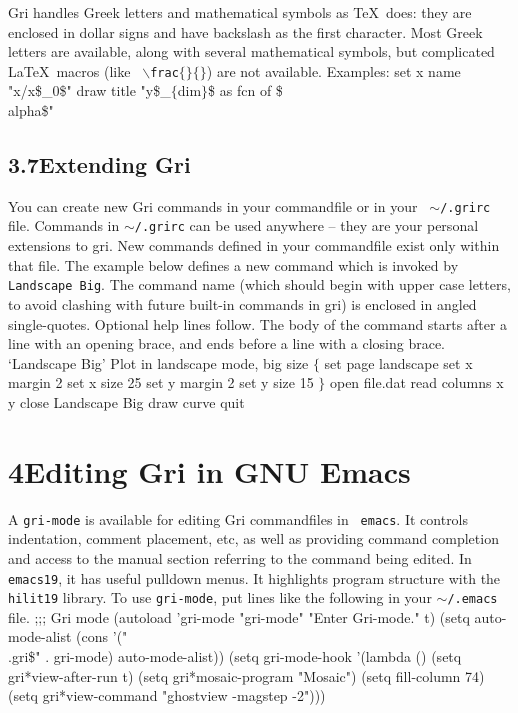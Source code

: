 Gri handles Greek letters and mathematical symbols as \TeX\ does: they
are enclosed in dollar signs and have backslash as the first
character.  Most Greek letters are available, along with several
mathematical symbols, but complicated La\TeX\ macros (like {\tt
$\backslash$frac$\lbrace\rbrace\lbrace\rbrace$}) are not available.
Examples:
\beginexample
set x name "x/x\$_0\$"
draw title "y\$_$\lbrace$dim$\rbrace$\$ as fcn of \$\\alpha\$"
\endexample



\subsection{3.7\quad Extending Gri}
You can create new Gri commands in your commandfile or in your {\tt
$\sim$/.grirc} file.  Commands in {\tt $\sim$/.grirc} can be used
anywhere -- they are your personal extensions to gri.  New commands
defined in your commandfile exist only within that file.  The example
below defines a new command which is invoked by {\tt Landscape Big}.
The command name (which should begin with upper case letters, to avoid
clashing with future built-in commands in gri) is enclosed in angled
single-quotes.  Optional help lines follow.  The body of the command
starts after a line with an opening brace, and ends before a line with
a closing brace.
\beginexample
`Landscape Big'
Plot in landscape mode, big size
$\lbrace$
    set page landscape
    set x margin 2
    set x size 25
    set y margin 2
    set y size 15
$\rbrace$
open file.dat
read columns x y
close
Landscape Big
draw curve
quit
\endexample

\section{4\quad Editing Gri in GNU Emacs}
A {\tt gri-mode} is available for editing Gri commandfiles in {\tt
emacs}.  It controls indentation, comment placement, etc, as well as
providing command completion and access to the manual section
referring to the command being edited.  In {\tt emacs19}, it has
useful pulldown menus.  It highlights program structure with the {\tt
hilit19} library.  To use {\tt gri-mode}, put lines like the following
in your {\tt $\sim$/.emacs} file.
\beginexample
;;; Gri mode
(autoload 'gri-mode "gri-mode" "Enter Gri-mode." t)
(setq auto-mode-alist 
    (cons '("\\.gri\$" . gri-mode) auto-mode-alist))
(setq gri-mode-hook
  '(lambda ()
    (setq gri*view-after-run t)
    (setq gri*mosaic-program "Mosaic")
    (setq fill-column 74)
    (setq gri*view-command "ghostview -magstep -2")))
\endexample

